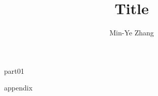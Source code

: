 \documentclass[a4paper,12pt]{report}
\begin{document}
\title{Title}
\author{Min-Ye Zhang}
\maketitle
\tableofcontents
{part01}

{appendix}

\end{document}
